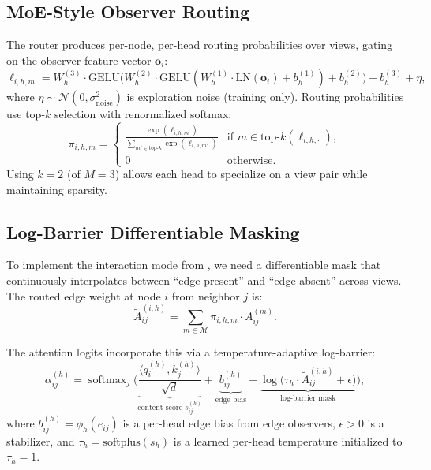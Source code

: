\documentclass[11pt,a4paper]{article}
\newcommand{\calM}{\mathcal{M}}
\DeclareMathOperator{\softmax}{softmax}
\begin{document}
\subsection{MoE-Style Observer Routing}
\label{sec:routing}

The router produces per-node, per-head routing probabilities over views,
gating on the observer feature vector $\mathbf{o}_i$:
\begin{equation}
  \label{eq:routing}
  \ell_{i,h,m} = W_h^{(3)} \cdot \mathrm{GELU}\!\big(
    W_h^{(2)} \cdot \mathrm{GELU}(
    W_h^{(1)} \cdot \mathrm{LN}(\mathbf{o}_i) + b_h^{(1)}
  ) + b_h^{(2)}\big) + b_h^{(3)} + \eta,
\end{equation}
where $\eta \sim \mathcal{N}(0, \sigma_{\text{noise}}^2)$ is
exploration noise (training only).
Routing probabilities use top-$k$ selection with renormalized softmax:
\begin{equation}
  \label{eq:topk}
  \pi_{i,h,m} =
  \begin{cases}
    \frac{\exp(\ell_{i,h,m})}{\sum_{m' \in \text{top-}k}
      \exp(\ell_{i,h,m'})} & \text{if } m \in \text{top-}k(\ell_{i,h,\cdot}), \\
    0 & \text{otherwise}.
  \end{cases}
\end{equation}
Using $k = 2$ (of $M = 3$) allows each head to specialize on a view
pair while maintaining sparsity.

\subsection{Log-Barrier Differentiable Masking}
\label{sec:logbarrier}

To implement the interaction mode from , we need a
differentiable mask that continuously interpolates between ``edge
present'' and ``edge absent'' across views.
The routed edge weight at node $i$ from neighbor $j$ is:
\begin{equation}
  \label{eq:routedA}
  \tilde{A}_{ij}^{(i,h)} = \sum_{m \in \calM}
    \pi_{i,h,m} \cdot A_{ij}^{(m)}.
\end{equation}

The attention logits incorporate this via a temperature-adaptive
log-barrier:
\begin{equation}
  \label{eq:logbarrier}
  \alpha_{ij}^{(h)} = \softmax_{j}\!\Big(
    \underbrace{\frac{\langle q_i^{(h)}, k_j^{(h)} \rangle}{\sqrt{d}}}
      _{\text{content score } s_{ij}^{(h)}}
    + \underbrace{b_{ij}^{(h)}}_{\text{edge bias}}
    + \underbrace{\log\!\big(\tau_h \cdot \tilde{A}_{ij}^{(i,h)}
      + \epsilon\big)}_{\text{log-barrier mask}}
  \Big),
\end{equation}
where $b_{ij}^{(h)} = \phi_h(e_{ij})$ is a per-head edge bias from
edge observers, $\epsilon > 0$ is a stabilizer, and
$\tau_h = \mathrm{softplus}(s_h)$ is a learned per-head temperature
initialized to $\tau_h = 1$.
\end{document}
